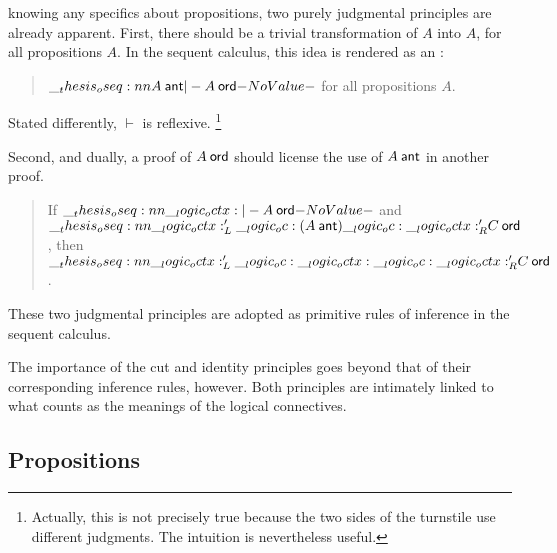


\clearpage 

 knowing any specifics about propositions, two purely judgmental principles are already apparent.
%
First, there should be a trivial transformation of $A$ into $A$, for all propositions $A$.
In the sequent calculus, this idea is rendered as an :
\begin{quotation}
  $\oseq{A \ant |- A \ord}$ for all propositions $A$.
\end{quotation}
Stated differently, $\vdash$ is reflexive.%
\footnote{Actually, this is not precisely true because the two sides of the turnstile use different judgments.
The intuition is nevertheless useful.}

Second, and dually, a proof of $A \ord$ should license the use of $A \ant$ in another proof.
\begin{quotation}
  If $\oseq{\octx |- A \ord}$ and $\oseq{\octx'_L \oc (A \ant) \oc \octx'_R |- C \ord}$, then $\oseq{\octx'_L \oc \octx \oc \octx'_R |- C \ord}$.
\end{quotation}

These two judgmental principles are adopted as primitive rules of inference in the sequent calculus.
The importance of the cut and identity principles goes beyond that of their corresponding inference rules, however.
Both principles are intimately linked to what counts as the meanings of the logical connectives.

\subsection{Propositions}

